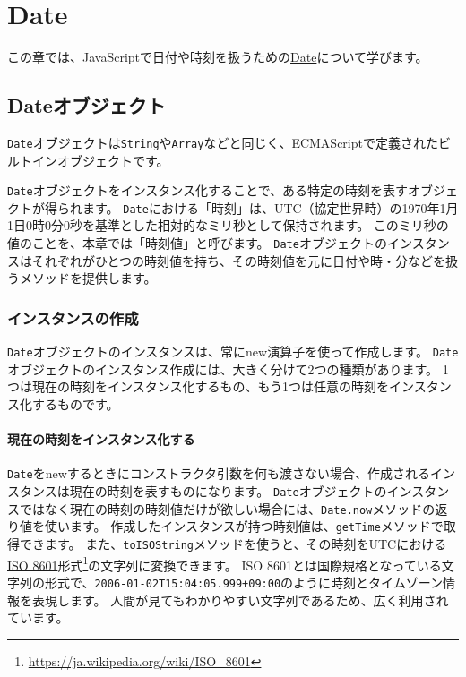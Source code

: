 \hypertarget{date}{%
\chapter{Date}\label{date}}
\thispagestyle{frontheadings}

この章では、JavaScriptで日付や時刻を扱うための\href{https://developer.mozilla.org/ja/docs/Web/JavaScript/Reference/Global_Objects/Date}{Date}について学びます。

\hypertarget{date-object}{%
\section{Dateオブジェクト}\label{date-object}}

\texttt{Date}オブジェクトは\texttt{String}や\texttt{Array}などと同じく、ECMAScriptで定義されたビルトインオブジェクトです。

\texttt{Date}オブジェクトをインスタンス化することで、ある特定の時刻を表すオブジェクトが得られます。
\texttt{Date}における「時刻」は、UTC（協定世界時）の1970年1月1日0時0分0秒を基準とした相対的なミリ秒として保持されます。
このミリ秒の値のことを、本章では「時刻値」と呼びます。
\texttt{Date}オブジェクトのインスタンスはそれぞれがひとつの時刻値を持ち、その時刻値を元に日付や時・分などを扱うメソッドを提供します。

\hypertarget{create-instance}{%
\subsection{インスタンスの作成}\label{create-instance}}

\texttt{Date}オブジェクトのインスタンスは、常にnew演算子を使って作成します。
\texttt{Date}オブジェクトのインスタンス作成には、大きく分けて2つの種類があります。
1つは現在の時刻をインスタンス化するもの、もう1つは任意の時刻をインスタンス化するものです。

\hypertarget{instance-current-time}{%
\subsubsection{現在の時刻をインスタンス化する}\label{instance-current-time}}

\texttt{Date}をnewするときにコンストラクタ引数を何も渡さない場合、作成されるインスタンスは現在の時刻を表すものになります。
\texttt{Date}オブジェクトのインスタンスではなく現在の時刻の時刻値だけが欲しい場合には、\texttt{Date.now}メソッドの返り値を使います。
作成したインスタンスが持つ時刻値は、\texttt{getTime}メソッドで取得できます。
また、\texttt{toISOString}メソッドを使うと、その時刻をUTCにおける\href{https://ja.wikipedia.org/wiki/ISO_8601}{ISO
8601}形式\footnote{\url{https://ja.wikipedia.org/wiki/ISO_8601}}の文字列に変換できます。 ISO
8601とは国際規格となっている文字列の形式で、\texttt{2006-01-02T15:04:05.999+09:00}のように時刻とタイムゾーン情報を表現します。
人間が見てもわかりやすい文字列であるため、広く利用されています。

